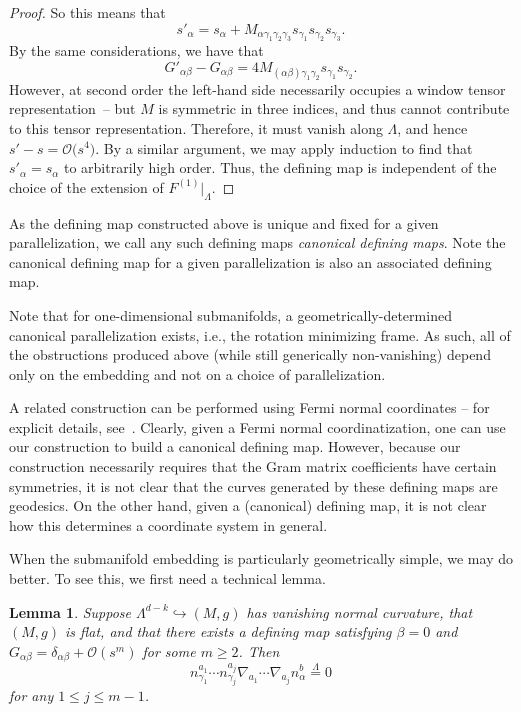 \documentclass[pdftex]{sigma}
\numberwithin{equation}{section}
\newtheorem{Lemma}[Theorem]{Lemma}
\renewcommand{\=}{\stackrel \Lambda =}
\begin{document}
\begin{proof}
So this means that
\[
s'_{\alpha} = s_{\alpha} + M_{\alpha \gamma_1 \gamma_2 \gamma_3} s_{\gamma_1} s_{\gamma_2} s_{\gamma_3} .
\]
By the same considerations, we have that
\[
G'_{\alpha \beta} - G_{\alpha \beta} = 4 M_{(\alpha \beta) \gamma_1 \gamma_2} s_{\gamma_1} s_{\gamma_2} .
\]
However, at second order the left-hand side necessarily occupies a window tensor representation~-- but $M$ is symmetric in three indices, and thus cannot contribute to this tensor representation. Therefore, it must vanish along $\Lambda$, and hence $s' - s = \mathcal{O}\bigl(s^4\bigr)$. By a similar argument, we may apply induction to find that $s'_{\alpha} = s_{\alpha}$ to arbitrarily high order. Thus, the defining map is independent of the choice of the extension of $F^{(1)}|_{\Lambda}$.
\end{proof}

As the defining map constructed above is unique and fixed for a given parallelization, we call any such defining maps \textit{canonical defining maps}. Note the canonical defining map for a given parallelization is also an associated defining map.

\begin{Remark} \label{curve-invariants}
Note that for one-dimensional submanifolds, a geometrically-determined canonical parallelization exists, i.e., the rotation minimizing frame. As such, all of the obstructions produced above (while still generically non-vanishing) depend only on the embedding and not on a choice of parallelization.
\end{Remark}

\begin{Remark}
A related construction can be performed using Fermi normal coordinates -- for explicit details, see~\cite{Gray,GrayBook}. Clearly, given a Fermi normal coordinatization, one can use our construction to build a canonical defining map. However, because our construction necessarily requires that the Gram matrix coefficients have certain symmetries, it is not clear that the curves generated by these defining maps are geodesics. On the other hand, given a (canonical) defining map, it is not clear how this determines a coordinate system in general.
\end{Remark}



When the submanifold embedding is particularly geometrically simple, we may do better. To see this, we first need a technical lemma.
\begin{Lemma} \label{lower-order-derivs}
Suppose $\Lambda^{d-k} \hookrightarrow (M,g)$ has vanishing normal curvature, that $(M,g)$ is flat, and that there exists a defining map satisfying $\beta = 0$ and $G_{\alpha \beta} = \delta_{\alpha \beta} + \mathcal{O}(s^m)$ for some $m \geq 2$. Then
\[
n^{a_1}_{\gamma_1} \cdots n^{a_j}_{\gamma_j} \nabla_{a_1} \cdots \nabla_{a_j} n^b_{\alpha} \= 0
\]
for any $1 \leq j \leq m-1$.
\end{Lemma}
\end{document}

